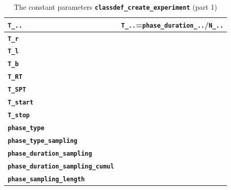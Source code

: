 \documentclass[12pt,oneside,notitlepage,abstracton,a4paper]{scrartcl}
\begin{document}
\begin{table}[!htbp]
\begin{center}
\begin{tabular}{|l|l|}
 \textbf{\texttt{T\_..}}         & \textbf{\texttt{T\_..}}=\textbf{\texttt{phase\_duration\_..}}/\textbf{\texttt{N\_..}}\\ \hline
 \textbf{\texttt{T\_r}}         & \\ \hline
 \textbf{\texttt{T\_l}}         & \\ \hline
 \textbf{\texttt{T\_b}}         & \\ \hline 
 \textbf{\texttt{T\_RT}}         & \\ \hline 
 \textbf{\texttt{T\_SPT}}         & \\ \hline 
 \textbf{\texttt{T\_start}}         & \\ \hline 
 \textbf{\texttt{T\_stop}}         & \\ \hline 
 \textbf{\texttt{phase\_type}}         & \\ \hline 
 \textbf{\texttt{phase\_type\_sampling}}         &  \\ \hline 
 \textbf{\texttt{phase\_duration\_sampling}}        &  \\ \hline 
 \textbf{\texttt{phase\_duration\_sampling\_cumul}} &  \\ \hline 
 \textbf{\texttt{phase\_sampling\_length}}         &  \\ \hline 
\end{tabular}
\caption {The constant parameters \textbf{\texttt{classdef\_create\_experiment}} (part 1)}
\label{tbl:paras4}
\end{center}
\end{table} 
\end{document}
